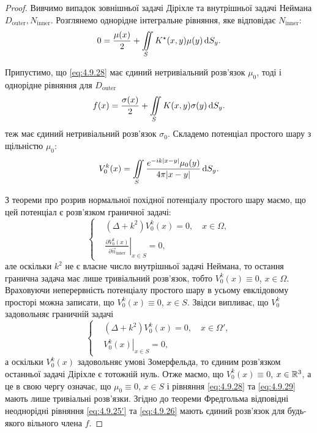 \begin{proof}
	Вивчимо випадок зовнішньої задачі Діріхле та внутрішньої задачі Неймана $D_{\text{outer}}, N_{\text{inner}}$. Розглянемо однорідне інтегральне рівняння, яке відповідає $N_{\text{inner}}$:
	\begin{equation}
		\label{eq:4.9.28}
		0 = \frac{\mu(x)}{2} + \displaystyle\iint\limits_S K^\star(x, y) \mu(y) \mathop{}\!\mathrm{d} S_y. 
	\end{equation}

	Припустимо, що \eqref{eq:4.9.28} має єдиний нетривіальний розв'язок $\mu_0$, тоді і однорідне рівняння для $D_{\text{outer}}$
	\begin{equation}
		\label{eq:4.9.29}
		f(x) = \frac{\sigma(x)}{2} + \displaystyle\iint\limits_S K(x, y) \sigma(y) \mathop{}\!\mathrm{d} S_y. 
	\end{equation}
	теж має єдиний нетривіальний розв'язок $\sigma_0$. Складемо потенціал простого шару з щільністю $\mu_0$:
	\begin{equation}
		V_0^k(x) = \displaystyle\iint\limits_S \frac{e^{-ik|x-y|}\mu_0(y)}{4\pi|x-y|}\mathop{}\!\mathrm{d} S_y.	
	\end{equation}

	З теореми про розрив нормальної похідної потенціалу простого шару маємо, що цей потенціал є розв'язком граничної задачі:
	\begin{equation}
		\left\{
			\begin{aligned}
				& (\Delta + k^2) V_0^k(x) = 0, \quad x \in \Omega, \\
				& \left. \frac{\partial V_0^k(x)}{\partial \vec n_{\text{inner}}} \right|_{x \in S} = 0,
			\end{aligned}
		\right.
	\end{equation}
	але оскільки $k^2$ не є власне число внутрішньої задачі Неймана, то остання гранична задача має лише тривіальний розв'язок, тобто $V_0^k(x) \equiv 0$, $x \in \Omega$. Враховуючи неперервність потенціалу простого шару в усьому евклідовому просторі можна записати, що $V_0^k(x) \equiv 0$, $x \in S$. Звідси випливає, що $V_0^k$ задовольняє граничній задачі
	\begin{equation}
		\left\{
			\begin{aligned}
				& (\Delta + k^2) V_0^k(x) = 0, \quad x \in \Omega', \\
				& \left. V_0^k(x) \right|_{x \in S} = 0,
			\end{aligned}
		\right.
	\end{equation}
	а оскільки $V_0^k(x)$ задовольняє умові Зомерфельда, то єдиним розв'язком останньої задачі Діріхле є тотожній нуль. Отже маємо, що $V_0^k(x) \equiv 0$, $x \in \mathbb{R}^3$, а це в свою чергу означає, що $\mu_0 \equiv 0$, $x \in S$ і рівняння \eqref{eq:4.9.28} та \eqref{eq:4.9.29} мають лише тривіальні розв'язки. Згідно до теореми Фредгольма відповідні неоднорідні рівняння \eqref{eq:4.9.25'} та \eqref{eq:4.9.26} мають єдиний розв'язок для будь-якого вільного члена $f$.
\end{proof}

